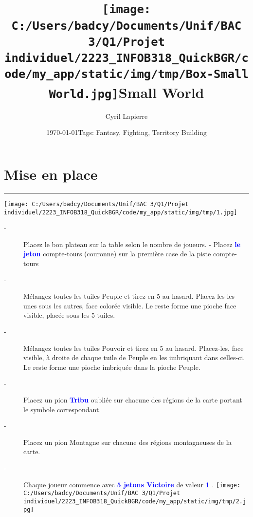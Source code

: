 \documentclass{scrartcl}%
\title{\texttt{[image: C:/Users/badcy/Documents/Unif/BAC 3/Q1/Projet individuel/2223\_INFOB318\_QuickBGR/code/my\_app/static/img/tmp/Box-Small World.jpg]}\break Small World }%
\author{Cyril Lapierre}%
\date{\today \break Tags: Fantasy, Fighting, Territory Building}%
\begin{document}
%
\normalsize%
\maketitle\thispagestyle{header}%
\pagestyle{header}%
\sectionfont{\color{blue}}%
\subsectionfont{\color{blue}}%
\subsubsectionfont{\color{blue}}%
\section{ Mise en place
}%
\label{sec:Miseenplace}%
\textcolor{blue}{\rule{18cm}{0.07cm}}\break%
%
\begin{center}\texttt{[image: C:/Users/badcy/Documents/Unif/BAC 3/Q1/Projet individuel/2223\_INFOB318\_QuickBGR/code/my\_app/static/img/tmp/1.jpg]}\end{center}%

%

%
\begin{description}%
\item[{-} ]%
%
 Placez le bon plateau sur la table selon le nombre de joueurs. {-} Placez %
\textcolor{blue}{%
\textbf{le jeton}%
}%
\textit{ }%
 compte{-}tours (couronne) sur la première case de la piste compte{-}tours
%
\item[{-} ]%
%
 Mélangez toutes les tuiles Peuple et tirez en 5 au hasard. Placez{-}les les unes sous les autres, face colorée visible. Le reste forme une pioche face visible, placée sous les 5 tuiles.
%
\item[{-} ]%
%
 Mélangez toutes les tuiles Pouvoir et tirez en 5 au hasard. Placez{-}les, face visible, à droite de chaque tuile de Peuple en les imbriquant dans celles{-}ci. Le reste forme une pioche imbriquée dans la pioche Peuple.
%
\item[{-} ]%
%
 Placez un pion %
\textcolor{blue}{%
\textbf{Tribu}%
}%
\textit{ }%
 oubliée sur chacune des régions de la carte portant le symbole correspondant.
%
\item[{-} ]%
%
 Placez un pion Montagne sur chacune des régions montagneuses de la carte.
%
\item[{-} ]%
%
 Chaque joueur commence avec %
\textcolor{blue}{%
\textbf{5 jetons Victoire}%
}%
\textit{ }%
 de valeur %
\textcolor{blue}{%
\textbf{1}%
}%
.%
\texttt{[image: C:/Users/badcy/Documents/Unif/BAC 3/Q1/Projet individuel/2223\_INFOB318\_QuickBGR/code/my\_app/static/img/tmp/2.jpg]}%

%

%
\end{description}
\end{document}
